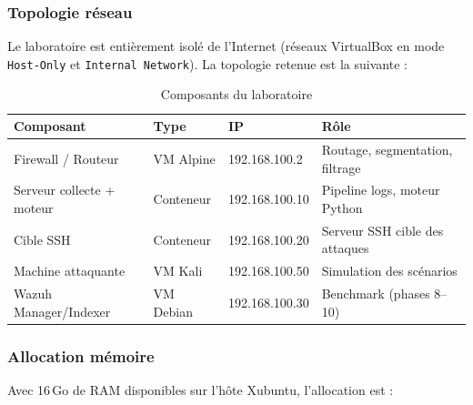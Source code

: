 \documentclass[11pt,a4paper]{article}
\begin{document}
\subsubsection{Topologie réseau}

Le laboratoire est entièrement isolé de l'Internet (réseaux VirtualBox
en mode \texttt{Host-Only} et \texttt{Internal Network}).
La topologie retenue est la suivante :

\begin{table}[H]
\centering
\caption{Composants du laboratoire}
\small
\begin{tabularx}{\textwidth}{L{3.2cm} C{1.6cm} C{2.2cm} L{4.8cm}}
\toprule
{}
{\color{white}\textbf{Composant}} &
{\color{white}\textbf{Type}} &
{\color{white}\textbf{IP}} &
{\color{white}\textbf{Rôle}} \\
\midrule
Firewall / Routeur & VM Alpine & 192.168.100.2 & Routage, segmentation, filtrage \\
\midrule
{}
Serveur collecte + moteur & Conteneur & 192.168.100.10 & Pipeline logs, moteur Python \\
\midrule
Cible SSH & Conteneur & 192.168.100.20 & Serveur SSH cible des attaques \\
\midrule
{}
Machine attaquante & VM Kali & 192.168.100.50 & Simulation des scénarios \\
\midrule
Wazuh Manager/Indexer & VM Debian & 192.168.100.30 & Benchmark (phases 8--10) \\
\bottomrule
\end{tabularx}
\end{table}

\subsubsection{Allocation mémoire}

Avec 16\,Go de RAM disponibles sur l'hôte Xubuntu, l'allocation est :
\end{document}
